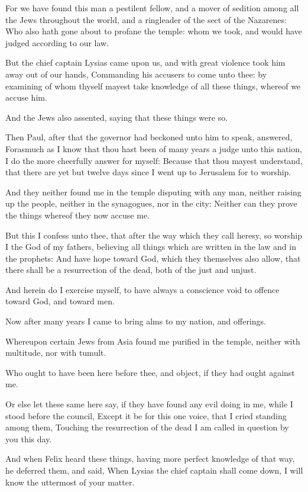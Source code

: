 \Verse For we have found this man a pestilent fellow, and a mover of sedition among all the Jews throughout the world, and a ringleader of the sect of the Nazarenes: \Verse Who also hath gone about to profane the temple: whom we took, and would have judged according to our law.

\Verse But the chief captain Lysias came upon us, and with great violence took him away out of our hands, \Verse Commanding his accusers to come unto thee: by examining of whom thyself mayest take knowledge of all these things, whereof we accuse him.

\Verse And the Jews also assented, saying that these things were so.

\Verse Then Paul, after that the governor had beckoned unto him to speak, answered, Forasmuch as I know that thou hast been of many years a judge unto this nation, I do the more cheerfully answer for myself: \Verse Because that thou mayest understand, that there are yet but twelve days since I went up to Jerusalem for to worship.

\Verse And they neither found me in the temple disputing with any man, neither raising up the people, neither in the synagogues, nor in the city: \Verse Neither can they prove the things whereof they now accuse me.

\Verse But this I confess unto thee, that after the way which they call heresy, so worship I the God of my fathers, believing all things which are written in the law and in the prophets: \Verse And have hope toward God, which they themselves also allow, that there shall be a resurrection of the dead, both of the just and unjust.

\Verse And herein do I exercise myself, to have always a conscience void to offence toward God, and toward men.

\Verse Now after many years I came to bring alms to my nation, and offerings.

\Verse Whereupon certain Jews from Asia found me purified in the temple, neither with multitude, nor with tumult.

\Verse Who ought to have been here before thee, and object, if they had ought against me.

\Verse Or else let these same here say, if they have found any evil doing in me, while I stood before the council, \Verse Except it be for this one voice, that I cried standing among them, Touching the resurrection of the dead I am called in question by you this day.

\Verse And when Felix heard these things, having more perfect knowledge of that way, he deferred them, and said, When Lysias the chief captain shall come down, I will know the uttermost of your matter.

